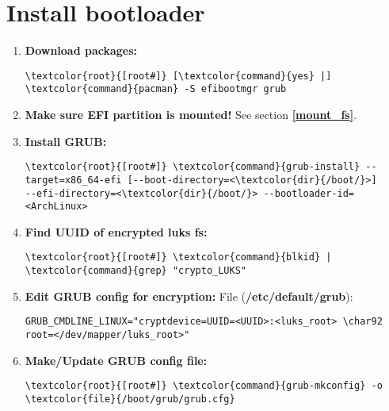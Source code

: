 \documentclass[10pt, a4paper, onecolumn, openany]{book} %
\begin{document}
\section{Install bootloader}
\begin{enumerate}
    \item \textbf{Download packages:}
\begin{Verbatim}[commandchars=\\\{\}]
\textcolor{root}{[root#]} [\textcolor{command}{yes} |] \textcolor{command}{pacman} -S efibootmgr grub
\end{Verbatim}
    \item \textbf{Make sure EFI partition is mounted!}
\newline See section \underline{\textbf{\ref{mount_fs}}}.
    \item \textbf{Install GRUB:}
\begin{Verbatim}[commandchars=\\\{\}]
\textcolor{root}{[root#]} \textcolor{command}{grub-install} --target=x86_64-efi [--boot-directory=<\textcolor{dir}{/boot/}>]
--efi-directory=<\textcolor{dir}{/boot/}> --bootloader-id=<ArchLinux>
\end{Verbatim}

    \item \textbf{Find UUID of encrypted luks fs:}
\begin{Verbatim}[commandchars=\\\{\}]
\textcolor{root}{[root#]} \textcolor{command}{blkid} | \textcolor{command}{grep} "crypto_LUKS"
\end{Verbatim}    

    \item \textbf{Edit GRUB config for encryption:}
\newline File (\textbf{\textcolor{file}{/etc/default/grub}}):
\begin{Verbatim}[commandchars=\\\{\}]
GRUB_CMDLINE_LINUX="cryptdevice=UUID=<UUID>:<luks_root> \char92 
root=</dev/mapper/luks_root>"
\end{Verbatim}

    \item \textbf{Make/Update GRUB config file:}
\begin{Verbatim}[commandchars=\\\{\}]
\textcolor{root}{[root#]} \textcolor{command}{grub-mkconfig} -o \textcolor{file}{/boot/grub/grub.cfg}
\end{Verbatim}
\end{enumerate}
\end{document}

